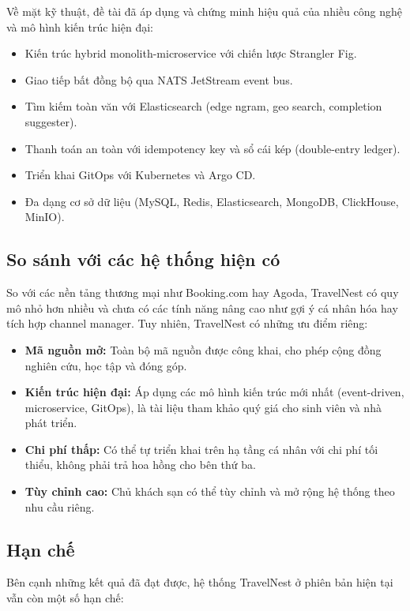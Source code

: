 \documentclass[13pt,a4paper,twoside]{report}
\begin{document}
Về mặt kỹ thuật, đề tài đã áp dụng và chứng minh hiệu quả của nhiều công nghệ và mô hình kiến trúc hiện đại:

\begin{itemize}
  \item Kiến trúc hybrid monolith-microservice với chiến lược Strangler Fig.
  \item Giao tiếp bất đồng bộ qua NATS JetStream event bus.
  \item Tìm kiếm toàn văn với Elasticsearch (edge ngram, geo search, completion suggester).
  \item Thanh toán an toàn với idempotency key và sổ cái kép (double-entry ledger).
  \item Triển khai GitOps với Kubernetes và Argo CD.
  \item Đa dạng cơ sở dữ liệu (MySQL, Redis, Elasticsearch, MongoDB, ClickHouse, MinIO).
\end{itemize}

\subsection{So sánh với các hệ thống hiện có}

So với các nền tảng thương mại như Booking.com hay Agoda, TravelNest có quy mô nhỏ hơn nhiều và chưa có các tính năng nâng cao như gợi ý cá nhân hóa hay tích hợp channel manager. Tuy nhiên, TravelNest có những ưu điểm riêng:

\begin{itemize}
  \item \textbf{Mã nguồn mở:} Toàn bộ mã nguồn được công khai, cho phép cộng đồng nghiên cứu, học tập và đóng góp.
  \item \textbf{Kiến trúc hiện đại:} Áp dụng các mô hình kiến trúc mới nhất (event-driven, microservice, GitOps), là tài liệu tham khảo quý giá cho sinh viên và nhà phát triển.
  \item \textbf{Chi phí thấp:} Có thể tự triển khai trên hạ tầng cá nhân với chi phí tối thiểu, không phải trả hoa hồng cho bên thứ ba.
  \item \textbf{Tùy chỉnh cao:} Chủ khách sạn có thể tùy chỉnh và mở rộng hệ thống theo nhu cầu riêng.
\end{itemize}

\subsection{Hạn chế}

Bên cạnh những kết quả đã đạt được, hệ thống TravelNest ở phiên bản hiện tại vẫn còn một số hạn chế:
\end{document}
